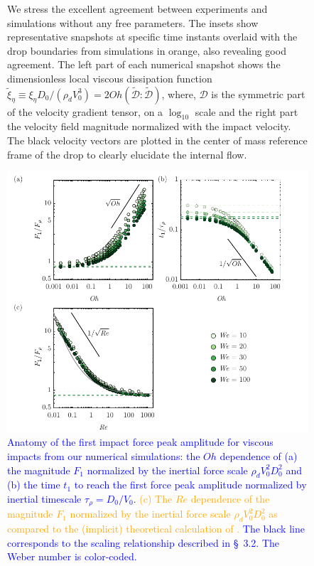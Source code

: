 \documentclass[]{article}
\newcommand*\blue{\textcolor{blue}}
\newcommand{\VS}[1]{{\textcolor{orange}{#1}}}
\begin{document}
\begin{enumerate}
\begin{figure}
{{		We stress the excellent agreement between experiments and simulations without any free parameters. The insets show representative snapshots at specific time instants overlaid with the drop boundaries from simulations in orange, also revealing good agreement. 
		The left part of each numerical snapshot shows the dimensionless local viscous dissipation function $\tilde{\xi}_\eta \equiv \xi_\eta D_0/\left(\rho_dV_0^3\right) = 2Oh\left(\boldsymbol{\tilde{\mathcal{D}}:\tilde{\mathcal{D}}}\right)$, where, $\boldsymbol{\mathcal{D}}$ is the symmetric part of the velocity gradient tensor, on a $\log_{10}$ scale and the right part the velocity field magnitude normalized with the impact velocity. The black velocity vectors are plotted in the center of mass reference frame of the drop to clearly elucidate the internal flow.}}
	 	\label{fig:summary}
	 \end{figure}
	 
	 \begin{figure}
	 	\centering
	 	\includegraphics[width=\textwidth]{../main/Figures/ForceTimeVersusOhnesorge.pdf}
	 	\caption{\blue{Anatomy of the first impact force peak amplitude for viscous impacts from our numerical simulations: the $Oh$ dependence of  (a) the magnitude $F_1$ normalized by the inertial force scale $\rho_dV_0^2D_0^2$ and (b) the time $t_1$ to reach the first force peak amplitude normalized by inertial timescale $\tau_\rho = D_0/V_0$}. \VS{(c) The $Re$ dependence of the magnitude $F_1$ normalized by the inertial force scale $\rho_dV_0^2D_0^2$ as compared to the (implicit) theoretical calculation of \citet{Gordillo2018}.} \blue{The black line corresponds to the scaling relationship described in \S~3.2. The Weber number is color-coded.}}
	 	\label{fig:F1Anatomy_2}
	 \end{figure}
	 

\end{enumerate}
\end{document}
